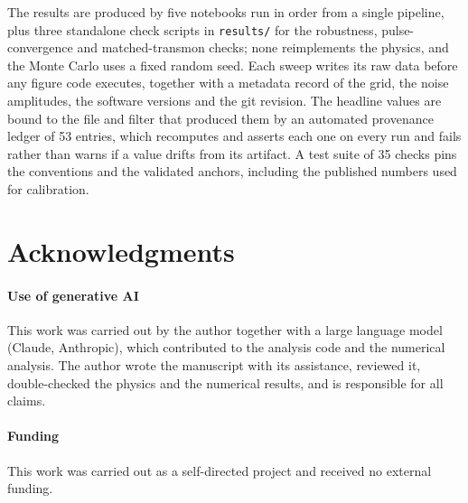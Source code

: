 \documentclass{SciPost}
\begin{document}
The results are produced by five notebooks run in order from a single pipeline, plus three
standalone check scripts in \texttt{results/} for the robustness, pulse-convergence and
matched-transmon checks; none reimplements the physics, and the Monte Carlo uses a fixed random
seed. Each sweep writes its raw data before any
figure code executes, together with a metadata record of the grid, the noise amplitudes, the
software versions and the git revision. The headline values are bound to the file and filter that produced them by an automated provenance ledger of 53 entries, which recomputes and asserts
each one on every run and fails rather than warns if a value drifts from its artifact. A test
suite of 35 checks pins the conventions and the validated anchors, including the published
numbers used for calibration.

\section*{Acknowledgments}

\paragraph{Use of generative AI}
This work was carried out by the author together with a large language model (Claude,
Anthropic), which contributed to the analysis code and the numerical analysis. The author
wrote the manuscript with its assistance, reviewed it, double-checked the physics and the
numerical results, and is responsible for all claims.

\paragraph{Funding}
This work was carried out as a self-directed project and received no external funding.


\end{document}
